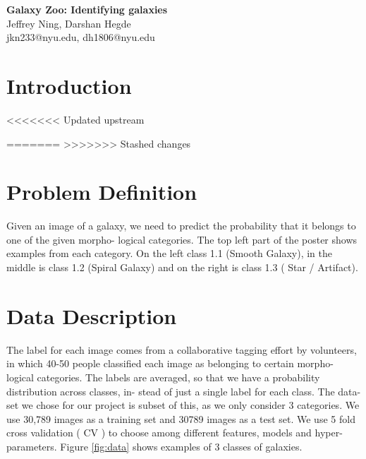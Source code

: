 \documentclass[10pt]{article}
\date{05/16/2014}
\begin{document}
\begin{flushleft}
{\Large
\textbf{Galaxy Zoo: Identifying galaxies}
}
\\
Jeffrey Ning, 
Darshan Hegde 
\\
jkn233@nyu.edu, dh1806@nyu.edu
\end{flushleft}

\section*{Introduction}

<<<<<<< Updated upstream

=======
>>>>>>> Stashed changes
\section*{Problem Definition}

Given an image of a galaxy, we need to predict the probability that it belongs to one of the given morpho- logical categories. The top left part of the poster shows examples from each category. On the left class 1.1 (Smooth Galaxy), in the middle is class 1.2 (Spiral Galaxy) and on the right is class 1.3 ( Star / Artifact).

\section*{Data Description}

The label for each image comes from a collaborative tagging effort by volunteers, in which 40-50 people classified each image as belonging to certain morpho- logical categories. The labels are averaged, so that we have a probability distribution across classes, in- stead of just a single label for each class. The data- set we chose for our project is subset of this, as we only consider 3 categories. We use 30,789 images as a training set and 30789 images as a test set. We use 5 fold cross validation ( CV ) to choose among different features, models and hyper-parameters. Figure \ref{fig:data} shows examples of 3 classes of galaxies.  
\end{document}

